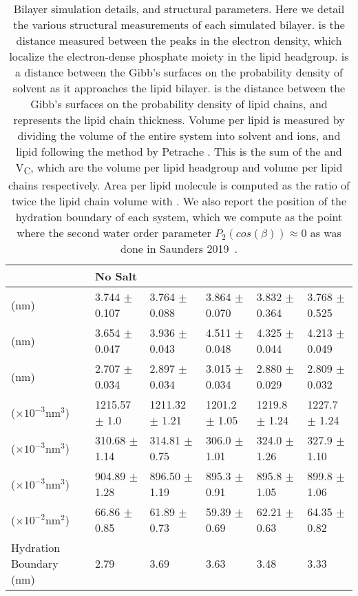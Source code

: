 \begin{table}
    \caption[Bilayer simulation details and structure]{Bilayer simulation details, and structural parameters. Here we detail the various
    structural measurements of each simulated bilayer.
    \dhh{} is the distance measured between the peaks in the electron density, which localize the electron-dense phosphate moiety in the lipid headgroup.
    \db{} is a distance between the Gibb's surfaces{\cite{fogarty:2015}} on the probability density of solvent as it approaches the lipid bilayer.
    \dc{} is the distance between the Gibb's surfaces on the probability density of lipid chains, and represents the lipid chain thickness.
    Volume per lipid \vl{} is measured by dividing the volume of the entire system into solvent and ions, and lipid following the method by Petrache \etal{}
    {\cite{petrache:1997}}.
    This \vl{} is the sum of the \vh{} and V\textsubscript{C}, which are the volume per lipid headgroup and volume per lipid chains respectively.
    Area per lipid molecule \al{} is computed as the ratio of twice the lipid chain volume \vc{} with \dc{}. We also report the
position of the hydration boundary of each system, which we compute as the point where the second water order parameter $P_2(cos(\beta))\approx 0$
{as was done in Saunders \etal{} 2019~\cite{saunders:2019}}.}
    \label{tabch3:struc}
    {\tiny
    \begin{tabularx}{\textwidth}{Y|Y|Y|Y|Y|Y}
            &No Salt&\na{} &\li{}&\mgmbnbfix{} &\mgmicro{} \\\hline
        \dhh{} (nm)    &3.744   $\pm$ 0.107  &3.764   $\pm$ 0.088 &3.864  $\pm$ 0.070&3.832  $\pm$ 0.364  &3.768  $\pm$ 0.525\\
        \db{}  (nm)    &3.654   $\pm$ 0.047  &3.936   $\pm$ 0.043 &4.511  $\pm$ 0.048&4.325  $\pm$ 0.044  &4.213  $\pm$ 0.049\\
        \dc{}  (nm)    &2.707   $\pm$ 0.034  &2.897   $\pm$ 0.034 &3.015  $\pm$ 0.034&2.880  $\pm$ 0.029  &2.809  $\pm$ 0.032\\
        \vl{}  ($\times 10^{-3}\text{nm}^3$)&1215.57 $\pm$ 1.0   &1211.32 $\pm$ 1.21 &1201.2 $\pm$ 1.05&1219.8 $\pm$ 1.24  &1227.7 $\pm$ 1.24\\
        \vh{}  ($\times 10^{-3}\text{nm}^3$)&310.68  $\pm$ 1.14  &314.81  $\pm$ 0.75 &306.0  $\pm$ 1.01&324.0  $\pm$ 1.26  &327.9  $\pm$ 1.10\\
        \vc{}  ($\times 10^{-3}\text{nm}^3$)&904.89  $\pm$ 1.28  &896.50  $\pm$ 1.19 &895.3  $\pm$ 0.91&895.8  $\pm$ 1.05  &899.8  $\pm$ 1.06\\
        \al{}  ($\times 10^{-2}\text{nm}^2$)&66.86   $\pm$ 0.85  &61.89   $\pm$ 0.73 &59.39  $\pm$ 0.69&62.21  $\pm$ 0.63  &64.35  $\pm$ 0.82\\
        Hydration Boundary (nm) & 2.79 &3.69&3.63 &3.48&3.33  \\
\end{tabularx}}
\end{table}

